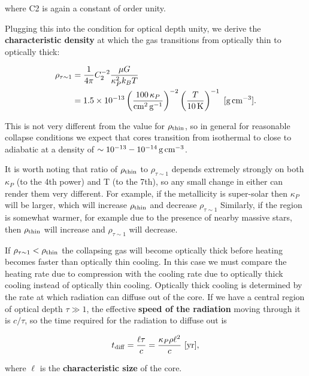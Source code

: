 \documentclass[a4paper,10pt]{article}
\begin{document}
{\noindent}where C2 is again a constant of order unity.

{\noindent}Plugging this into the condition for optical depth unity, we derive the \textbf{characteristic density} at which the gas transitions from optically thin to optically thick:

\begin{align*}
    \rho_{\tau\sim1} &= \frac{1}{4\pi} C_2^{-2} \frac{\mu G}{\kappa_P^2k_BT} \\
    &= 1.5\times10^{-13} \left(\frac{100\,\kappa_P}{{\rm cm^2\,g^{-1}}}\right)^{-2} \left(\frac{T}{10\,{\rm K}}\right)^{-1} ~ [{\rm g\,cm^{-3}}].
\end{align*}

{\noindent}This is not very different from the value for $\rho_{\rm thin}$, so in general for reasonable collapse conditions we expect that cores transition from isothermal to close to adiabatic at a density of $\sim10^{-13}-10^{-14}\,{\rm g\,cm^{-3}}$.

{\noindent}It is worth noting that ratio of $\rho_{\rm thin}$ to $\rho_{\tau\sim1}$ depends extremely strongly on both $\kappa_P$ (to the 4th power) and T (to the 7th), so any small change in either can render them very different. For example, if the metallicity is super-solar then $\kappa_P$ will be larger, which will increase $\rho_{\rm thin}$ and decrease $\rho_{\tau\sim1}$ Similarly, if the region is somewhat warmer, for example due to the presence of nearby massive stars, then $\rho_{\rm thin}$ will increase and $\rho_{\tau\sim1}$ will decrease.

{\noindent}If $\rho_{\tau\sim1}<\rho_{\rm thin}$ the collapsing gas will become optically thick before heating becomes faster than optically thin cooling. In this case we must compare the heating rate due to compression with the cooling rate due to optically thick cooling instead of optically thin cooling. Optically thick cooling is determined by the rate at which radiation can diffuse out of the core. If we have a central region of optical depth $\tau\gg1$, the effective \textbf{speed of the radiation} moving through it is $c/\tau$, so the time required for the radiation to diffuse out is

\begin{align*}
    t_{\rm diff} = \frac{\ell\tau}{c} = \frac{\kappa_P\rho\ell^2}{c} ~ [{\rm yr}],
\end{align*}

{\noindent}where $\ell$ is the \textbf{characteristic size} of the core.
\end{document}
